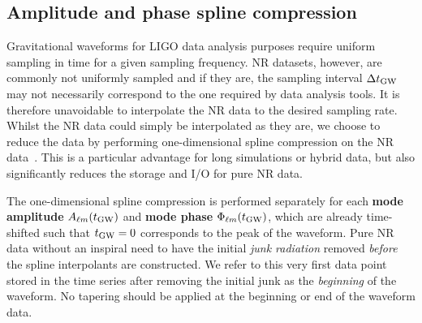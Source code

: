 \documentclass[11pt,tightenlines,article,amssymb,amsmath,amsfonts,superscriptaddress,nofootinbib]{revtex4}
\newcommand{\tGW}{t_{\rm GW}}
\begin{document}
\subsection{Amplitude and phase spline compression}
\label{sec:spline}
Gravitational waveforms for LIGO data analysis purposes require
uniform sampling in time for a given sampling frequency.  NR datasets,
however, are commonly not uniformly sampled and if they are, the
sampling interval $\Delta \tGW$ may not necessarily correspond to the
one required by data analysis tools.  It is therefore unavoidable to
interpolate the NR data to the desired sampling rate. Whilst the NR
data could simply be interpolated as they are, we choose to reduce the
data by performing one-dimensional spline compression on the NR
data~\cite{Galley:2016mvy}. This is a particular advantage for long
simulations or hybrid data, but also significantly reduces the storage
and I/O for pure NR data.

The one-dimensional spline compression is performed separately for each {\bf mode amplitude} $A_{\ell m}(\tGW)$ and {\bf mode phase} $\Phi_{\ell m}(\tGW)$, which are
already time-shifted such that $\tGW=0$ corresponds to the peak of the waveform. 
Pure NR data without an inspiral need to have the initial \emph{junk radiation} removed \emph{before} the spline interpolants are constructed. We refer to this very first data point stored in the time series after removing the initial junk as the \emph{beginning} of the waveform. No tapering should be applied at the beginning or end of the waveform data. 
\end{document}
